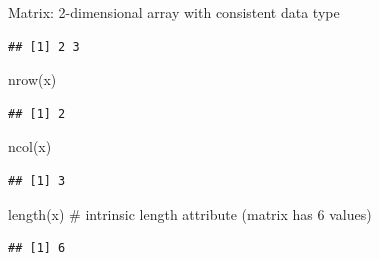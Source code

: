 \documentclass[
  9pt,
  ignorenonframetext,
]{beamer}
\newenvironment{Shaded}{\begin{snugshade}}{\end{snugshade}}
\newcommand{\CommentTok}[1]{\textcolor[rgb]{0.50,0.62,0.50}{#1}}
\newcommand{\KeywordTok}[1]{\textcolor[rgb]{0.94,0.87,0.69}{#1}}
\newcommand{\NormalTok}[1]{\textcolor[rgb]{0.80,0.80,0.80}{#1}}
\begin{document}
\begin{frame}[fragile]{Matrix: 2-dimensional array with consistent data
type}
\begin{verbatim}
## [1] 2 3
\end{verbatim}

\begin{Shaded}
\begin{Highlighting}[]
\KeywordTok{nrow}\NormalTok{(x)}
\end{Highlighting}
\end{Shaded}

\begin{verbatim}
## [1] 2
\end{verbatim}

\begin{Shaded}
\begin{Highlighting}[]
\KeywordTok{ncol}\NormalTok{(x)}
\end{Highlighting}
\end{Shaded}

\begin{verbatim}
## [1] 3
\end{verbatim}

\begin{Shaded}
\begin{Highlighting}[]
\KeywordTok{length}\NormalTok{(x) }\CommentTok{\# intrinsic length attribute (matrix has 6 values) }
\end{Highlighting}
\end{Shaded}

\begin{verbatim}
## [1] 6
\end{verbatim}
\end{frame}
\end{document}
